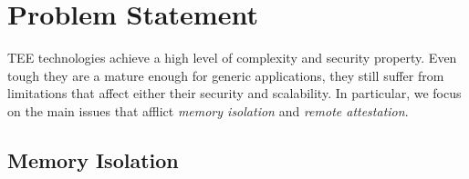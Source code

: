 %


\section{Problem Statement}

TEE technologies achieve a high level of complexity and security property.
Even tough they are a mature enough for generic applications, they still suffer 
from limitations that affect either their security and scalability.
In particular, we focus on the main issues that afflict \emph{memory 
isolation} and \emph{remote attestation}. 

\subsection{Memory Isolation}


